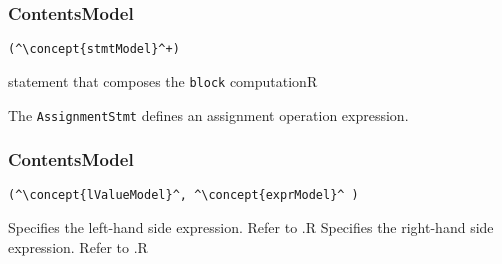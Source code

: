\subsubsection*{ContentsModel}{}

\begin{lstlisting}[style=default,frame=none]
(^\concept{stmtModel}^+)
\end{lstlisting}

\begin{HIRChildElements}
	{statement that composes the {\tt block} computation}{R}
\end{HIRChildElements}


The {\tt AssignmentStmt} defines an assignment operation expression.

\subsubsection*{ContentsModel}{}

\begin{lstlisting}[style=default,frame=none]
(^\concept{lValueModel}^, ^\concept{exprModel}^ )
\end{lstlisting}


\begin{HIRChildElements}
	{Specifies the left-hand side expression. 
	 Refer to .}{R}
	{Specifies the right-hand side expression. 
	 Refer to .}{R}
\end{HIRChildElements}


